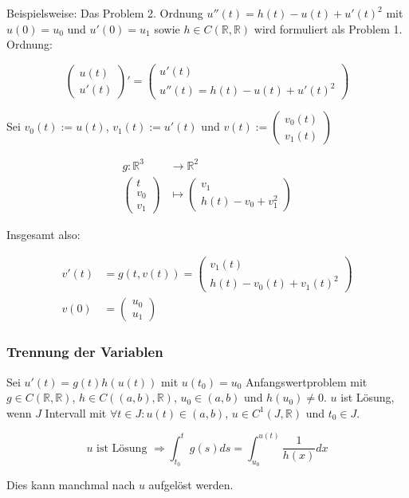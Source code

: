 Beispielsweise: Das Problem 2. Ordnung $u''(t)=h(t)-u(t)+u'(t)^2$ mit $u(0)=u_0$ und $u'(0)=u_1$ sowie $h \in C(\mathbb{R}, \mathbb{R})$ wird formuliert als Problem 1. Ordnung:

$$\begin{pmatrix}u(t)\\u'(t)\end{pmatrix}' = \begin{pmatrix}u'(t)\\u''(t)=h(t)-u(t)+u'(t)^2\end{pmatrix}$$

Sei $v_0(t):=u(t)$, $v_1(t):=u'(t)$ und $v(t):=\begin{pmatrix}v_0(t)\\v_1(t)\end{pmatrix}$

\vspace*{-4mm}
\begin{align*}
	g : \mathbb{R}^3 &\rightarrow \mathbb{R}^2 \\
	\begin{pmatrix}t\\v_0\\v_1\end{pmatrix} &\mapsto \begin{pmatrix}v_1\\h(t)-v_0+v_1^2\end{pmatrix}
\end{align*}

Insgesamt also:

\vspace*{-4mm}
\begin{align*}
	v'(t)&=g(t,v(t))=\begin{pmatrix}v_1(t)\\h(t)-v_0(t)+v_1(t)^2\end{pmatrix}\\
	v(0)&=\begin{pmatrix}u_0\\u_1\end{pmatrix}
\end{align*}

\subsubsection*{Trennung der Variablen}

Sei $u'(t)=g(t)h(u(t))$ mit $u(t_0)=u_0$ Anfangswertproblem mit $g \in C(\mathbb{R}, \mathbb{R})$, $h \in C((a, b), \mathbb{R})$, $u_0 \in (a, b)$ und $h(u_0) \neq 0$. $u$ ist Lösung, wenn $J$ Intervall mit $\forall t \in J : u(t) \in (a, b)$, $u \in C^1(J, \mathbb{R})$ und $t_0 \in J$.

\vspace*{-5mm}
$$u \text{ ist Lösung } \Rightarrow \int_{t_0}^t g(s) ds = \int_{u_0}^{u(t)} \frac{1}{h(x)} dx$$
\vspace*{-3mm}

Dies kann manchmal nach $u$ aufgelöst werden.
